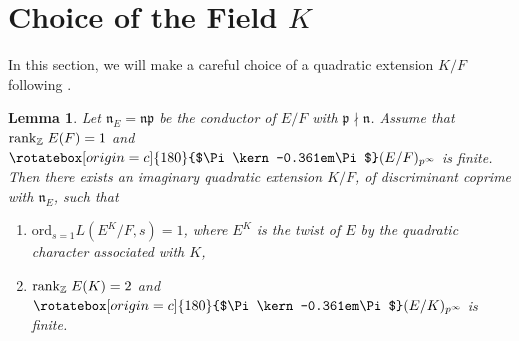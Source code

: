 \documentclass[reqno,10pt]{amsart}
\newcommand{\z}{\mathbb{Z}}
\newcommand{\n}{\mathfrak{n}}
\newcommand{\Varpi}{\rotatebox[origin=c]{180}{$\Pi\kern-0.361em\Pi$}}
\theoremstyle{plain}
\newtheorem{lem}[thm]{Lemma}
\theoremstyle{definition}
\begin{document}
\section{Choice of the Field $K$} \label{ChoiceOfK}
In this section, we will make a careful choice of a quadratic extension $K/F$ following \cite{FriedbergHoffstein}.
\\
\begin{lem} \label{Choice of K Lemma}
    Let $\n_E = \mathfrak{np}$ be the conductor of $E/F$ with $\mathfrak{p} \nmid \mathfrak{n}$. Assume that $\mathrm{rank}_\z \hspace{0.01mm} \hspace{1mm} E(F) = 1$ and $\Varpi(E/F)_{p^\infty}$ is finite. Then there exists an imaginary quadratic extension  $K/F$, of discriminant coprime with $\n_E$, such that 
    \begin{enumerate}
        \item $\mathrm{ord}_{s=1} L(E^K/F,s) = 1$, where $E^K$ is the twist of $E$ by the quadratic character associated with $K$,
        \item $\mathrm{rank}_\z \hspace{0.01mm} \hspace{1mm} E(K) = 2$ and $\Varpi(E/K)_{p^\infty}$ is finite.
    \end{enumerate}
\end{lem}
\end{document}
